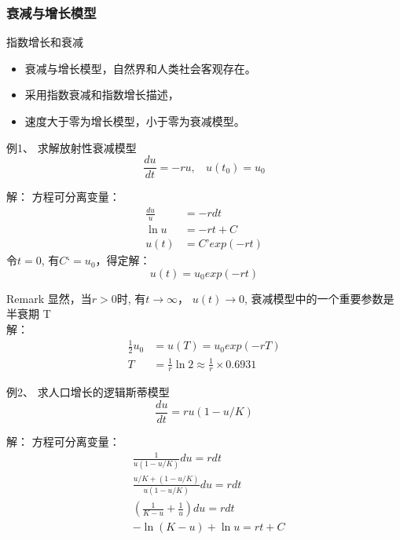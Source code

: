 \begin{frame}
\frametitle{衰减与增长模型}
	\begin{block}{指数增长和衰减}
	\begin{itemize}
		\item 衰减与增长模型，自然界和人类社会客观存在。
		\item 采用指数衰减和指数增长描述，
		\item 速度大于零为增长模型，小于零为衰减模型。
	\end{itemize}
	\end{block}
\end{frame}

\begin{frame}
	\begin{exampleblock} {例1、	求解放射性衰减模型}
	\begin{equation*}
	\frac{du}{dt}	= - ru, ~~~~ u(t_0) = u_0
	\end{equation*}
	\end{exampleblock} 	
	\alert{解：} 方程可分离变量：
	\begin{align*}
		\frac{du}{u} &= - rdt\\
		\ln u &=-rt+C\\
		u(t)&=C’exp(-rt)	
	\end{align*}
	令$t=0$, 有$C‘=u_0$，得定解：
	\begin{equation*}
		u(t)=u_0 exp(-rt)
	\end{equation*}
\end{frame}


\begin{frame}
\begin{block} {Remark}
	显然，当$r>0$时, 有$t \to \infty$， $u(t) \to 0$,  衰减模型中的一个重要参数是半衰期 T\\
	\alert{解：} 
	\begin{align*}
	\frac{1}{2}u_0 &=u(T) =u_0 exp(-rT)\\
	T &=\frac{1}{r} \ln 2  \approx \frac{1}{r} \times 0.6931	
	\end{align*}
	\end{block}
\end{frame}

\begin{frame}
	\begin{exampleblock} {例2、	求人口增长的逻辑斯蒂模型}
	\begin{equation*}
		\frac{d u}{d t}=r u (1-u/K)
	\end{equation*}
	\end{exampleblock} 	
	\alert{解：} 方程可分离变量：
	\begin{align*}
		&\frac{1}{u(1-u / K)}du =r d t \\
		&\frac{u / K+(1-u / K)}{u(1-u / K)} d u =r d t	\\
		&(\frac{1}{K-u}+\frac{1}{u} ) d u =r d t \\
		&-\ln (K-u)+\ln u =r t+C \\
	\end{align*}	
\end{frame}

